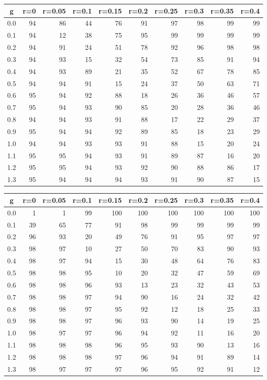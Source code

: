 %
\begin{table}[!tbp]
 \begin{center}
 \begin{tabular}{rrrrrrrrrr}\hline\hline
\multicolumn{1}{c}{g}&\multicolumn{1}{c}{r=0}&\multicolumn{1}{c}{r=0.05}&\multicolumn{1}{c}{r=0.1}&\multicolumn{1}{c}{r=0.15}&\multicolumn{1}{c}{r=0.2}&\multicolumn{1}{c}{r=0.25}&\multicolumn{1}{c}{r=0.3}&\multicolumn{1}{c}{r=0.35}&\multicolumn{1}{c}{r=0.4}\tabularnewline
\hline
0.0&94&86&44&76&91&97&98&99&99\tabularnewline
0.1&94&12&38&75&95&99&99&99&99\tabularnewline
0.2&94&91&24&51&78&92&96&98&98\tabularnewline
0.3&94&93&15&32&54&73&85&91&94\tabularnewline
0.4&94&93&89&21&35&52&67&78&85\tabularnewline
0.5&94&94&91&15&24&37&50&63&71\tabularnewline
0.6&95&94&92&88&18&26&36&46&57\tabularnewline
0.7&95&94&93&90&85&20&28&36&46\tabularnewline
0.8&94&94&93&91&88&17&22&29&37\tabularnewline
0.9&95&94&94&92&89&85&18&23&29\tabularnewline
1.0&94&94&93&93&91&88&15&20&24\tabularnewline
1.1&95&95&94&93&91&89&87&16&20\tabularnewline
1.2&95&95&94&93&92&90&88&86&17\tabularnewline
1.3&95&94&94&94&93&91&90&87&15\tabularnewline
\hline
\end{tabular}

\end{center}

\end{table}

%
\begin{table}[!tbp]
 \begin{center}
 \begin{tabular}{rrrrrrrrrr}\hline\hline
\multicolumn{1}{c}{g}&\multicolumn{1}{c}{r=0}&\multicolumn{1}{c}{r=0.05}&\multicolumn{1}{c}{r=0.1}&\multicolumn{1}{c}{r=0.15}&\multicolumn{1}{c}{r=0.2}&\multicolumn{1}{c}{r=0.25}&\multicolumn{1}{c}{r=0.3}&\multicolumn{1}{c}{r=0.35}&\multicolumn{1}{c}{r=0.4}\tabularnewline
\hline
0.0& 1& 1&99&100&100&100&100&100&100\tabularnewline
0.1&39&65&77& 91& 98& 99& 99& 99& 99\tabularnewline
0.2&96&93&20& 49& 76& 91& 95& 97& 97\tabularnewline
0.3&98&97&10& 27& 50& 70& 83& 90& 93\tabularnewline
0.4&98&97&94& 15& 30& 48& 64& 76& 83\tabularnewline
0.5&98&98&95& 10& 20& 32& 47& 59& 69\tabularnewline
0.6&98&98&96& 93& 13& 23& 32& 43& 53\tabularnewline
0.7&98&98&97& 94& 90& 16& 24& 32& 42\tabularnewline
0.8&98&98&97& 95& 92& 12& 18& 25& 33\tabularnewline
0.9&98&98&97& 96& 93& 90& 14& 19& 25\tabularnewline
1.0&98&97&97& 96& 94& 92& 11& 16& 20\tabularnewline
1.1&98&98&98& 96& 95& 93& 90& 13& 16\tabularnewline
1.2&98&98&98& 97& 96& 94& 91& 89& 14\tabularnewline
1.3&98&97&97& 97& 96& 95& 92& 91& 12\tabularnewline
\hline
\end{tabular}

\end{center}

\end{table}

